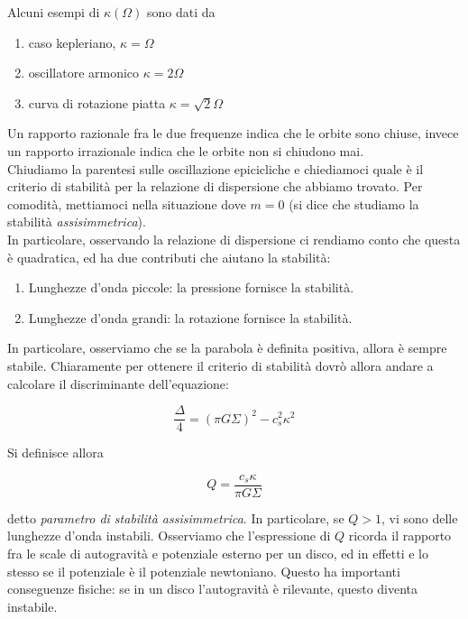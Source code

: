 \documentclass{report}
\begin{document}
Alcuni esempi di $\kappa(\Omega)$ sono dati da 
\begin{enumerate}
    \item caso kepleriano, $\kappa = \Omega$ 
    \item oscillatore armonico $\kappa = 2\Omega$
    \item curva di rotazione piatta $\kappa = \sqrt{2}\Omega$
\end{enumerate}

Un rapporto razionale fra le due frequenze indica che le orbite sono chiuse, invece un rapporto irrazionale indica che le orbite non si chiudono mai. \\

Chiudiamo la parentesi sulle oscillazione epicicliche e chiediamoci quale è il criterio di stabilità per la relazione di dispersione che abbiamo trovato. Per comodità, mettiamoci nella situazione dove $m=0$ (si dice che studiamo la stabilità \emph{assisimmetrica}). \\ 

In particolare, osservando la relazione di dispersione ci rendiamo conto che questa è quadratica, ed ha due contributi che aiutano la stabilità: 
\begin{enumerate}
    \item Lunghezze d'onda piccole: la pressione fornisce la stabilità. 
    \item Lunghezze d'onda grandi: la rotazione fornisce la stabilità. 
\end{enumerate}

In particolare, osserviamo che se la parabola è definita positiva, allora è sempre stabile. Chiaramente per ottenere il criterio di stabilità dovrò allora andare a calcolare il discriminante dell'equazione: 

\begin{equation}
    \frac{\Delta}{4} = (\pi G \Sigma)^2 - c_s^2\kappa^2
\end{equation}

Si definisce allora 
\begin{tcolorbox}[colback=myg!15, colframe=black, boxrule=1pt]
\begin{equation}
    Q = \frac{c_s\kappa}{\pi G \Sigma}
\end{equation}
\end{tcolorbox}
detto \emph{parametro di stabilità assisimmetrica}. In particolare, se $Q>1$, vi sono delle lunghezze d'onda instabili. Osserviamo che l'espressione di $Q$ ricorda il rapporto fra le scale di autogravità e potenziale esterno per un disco, ed in effetti e lo stesso se il potenziale è il potenziale newtoniano. Questo ha importanti conseguenze fisiche: se in un disco l'autogravità è rilevante, questo diventa instabile. \\
\end{document}

